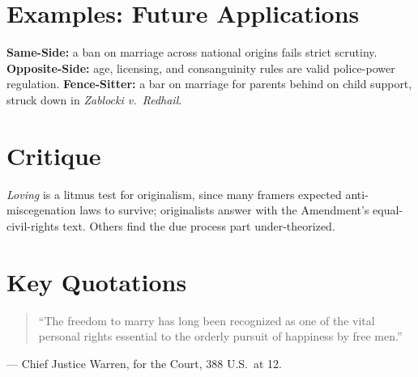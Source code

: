 \documentclass[12pt]{article}
\begin{document}
\section{Examples: Future Applications}
\textbf{Same-Side:} a ban on marriage across national origins fails strict scrutiny. \textbf{Opposite-Side:} age, licensing, and consanguinity rules are valid police-power regulation. \textbf{Fence-Sitter:} a bar on marriage for parents behind on child support, struck down in \textit{Zablocki v.\ Redhail}.

\section{Critique}
\textit{Loving} is a litmus test for originalism, since many framers expected anti-miscegenation laws to survive; originalists answer with the Amendment's equal-civil-rights text. Others find the due process part under-theorized.

\section{Key Quotations}
\begin{quote}
``The freedom to marry has long been recognized as one of the vital personal rights essential to the orderly pursuit of happiness by free men.''
\end{quote}
\noindent --- Chief Justice Warren, for the Court, 388 U.S.\ at 12.
\end{document}
